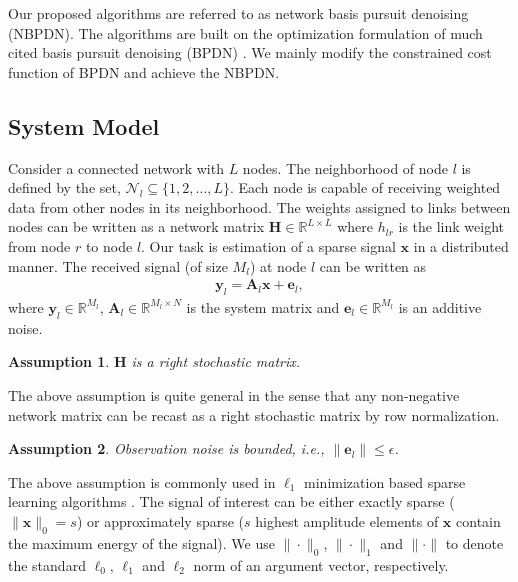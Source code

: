\documentclass[journal]{IEEEtran}
\newcommand{\mbx}{\mathbf{x}}
\newcommand{\mbA}{\mathbf{A}}
\newcommand{\mbH}{\mathbf{H}}
\newcommand{\mby}{\mathbf{y}}
\newcommand{\mbe}{\mathbf{e}}
\newtheorem{assumption}{Assumption}
\begin{document}
Our proposed algorithms are referred to as network basis pursuit denoising (NBPDN). The algorithms are built on the optimization formulation of much cited basis pursuit denoising (BPDN) \cite{Chen_Donoho_Saunders_1998}. We mainly modify the constrained cost function of BPDN and achieve the NBPDN.

\subsection{System Model}
\label{subsec:sys_model}
Consider a connected network with $L$ nodes. The neighborhood of node $l$ is  defined by the set, $\mathcal{N}_l \subseteq \{1,2,\hdots,L\}$. Each node is capable of receiving weighted data from other nodes in its neighborhood. The weights assigned to links between nodes can be written as a network matrix $\mbH \in \mathbb{R}^{L \times L}$ where $h_{lr}$ is the link weight from node $r$ to node $l$.
Our task is estimation of a sparse signal $\mbx$ in a distributed manner. The received signal (of size $M_l$) at node $l$ can be written as
\begin{eqnarray}
\label{eq:system_model}
\mby_l = \mbA_l \mbx + \mbe_l,
\end{eqnarray}
where $\mby_l \in \mathbb{R}^{M_l}$, $\mbA_l \in \mathbb{R}^{M_l \times N}$ is the system matrix and $\mbe_l \in \mathbb{R}^{M_l}$ is an additive noise.
\begin{assumption}
$\mbH$ is a right stochastic matrix.
\end{assumption}
The  above assumption is quite general in the sense that any non-negative network matrix can be recast as a right stochastic matrix by row normalization. 
\begin{assumption}
Observation noise is bounded, i.e., $\|\mbe_l\| \leq \epsilon$.
\end{assumption}
The above assumption is commonly used in $\ell_1$ minimization based sparse learning algorithms \cite{Candes_Romberg_Tao_2006_Stable_recovery}.
The signal of interest can be either exactly sparse ($\|\mbx\|_0 = s$) or approximately sparse ($s$ highest amplitude elements of $\mbx$ contain the maximum energy of the signal). We use $\|\cdot\|_0$, $\|\cdot\|_1$ and $\|\cdot\|$ to denote the standard $\ell_0$, $\ell_1$ and $\ell_2$ norm of an argument vector, respectively. 
\end{document}
